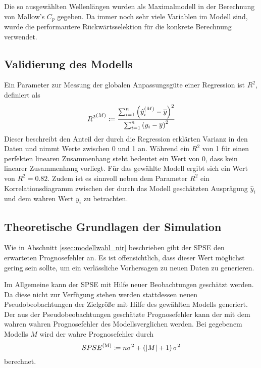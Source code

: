 	Die so ausgewählten Wellenlängen wurden als Maximalmodell in der Berechnung von Mallow's $C_p$ gegeben. Da immer noch sehr viele Variablen im Modell sind, wurde die performantere Rückwärtsselektion für die konkrete Berechnung verwendet.

	\subsection{Validierung des Modells}
	\label{ssec:model-validation}
	   Ein Parameter zur Messung der globalen Anpassungsgüte einer Regression ist $R^2$, definiert als \cite{Lang2007}
		\[
			{R^2}^{(M)} \coloneqq \frac {\sum_{i=1}^n \left( \hat{y}^{(M)}_i - \overline{y} \right)^2}{\sum_{i=1}^n \left( y_i - \overline{y} \right)^2}
		\]
		Dieser beschreibt den Anteil der durch die Regression erklärten Varianz in den Daten und nimmt Werte zwischen 0 und 1 an.
		Während ein $R^2$ von 1 für einen perfekten linearen Zusammenhang steht bedeutet ein Wert von 0, dass kein linearer Zusammenhang vorliegt.
		Für das gewählte Modell ergibt sich ein Wert von $R^2 =  0.82$.
		Zudem ist es sinnvoll neben dem Parameter $R^2$ ein Korrelationsdiagramm zwischen der durch das Modell geschätzten Ausprägung $\hat{y}_i$ und dem wahren Wert $y_i$ zu betrachten.




	\subsection{Theoretische Grundlagen der Simulation}
	\label{ssec:Theoretische Grundlagen der Simulation}

        Wie in Abschnitt \ref{ssec:modellwahl_nir} beschrieben gibt der SPSE den erwarteten Prognosefehler an.
        Es ist offensichtlich, dass dieser Wert möglichst gering sein sollte, um ein verlässliche Vorhersagen zu neuen Daten zu generieren.

        Im Allgemeine kann der SPSE mit Hilfe neuer Beobachtungen geschätzt werden.\cite{Schumacher Skript}
        Da diese nicht zur Verfügung stehen werden stattdessen neuen Pseudobeobachtungen der Zielgröße mit Hilfe des gewählten Modells generiert.
        Der aus der Pseudobeobachtungen geschätzte Prognosefehler kann der mit dem wahren wahren Prognosefehler des Modellsverglichen werden.
        Bei gegebenem Modells $M$ wird der wahre Prognosefehler durch
        \[
            SPSE^{\mathrm{(M)}} \coloneqq  n \sigma^2 + \left( \left\vert M \right\vert+1 \right) \sigma^2
        \]
        berechnet.

